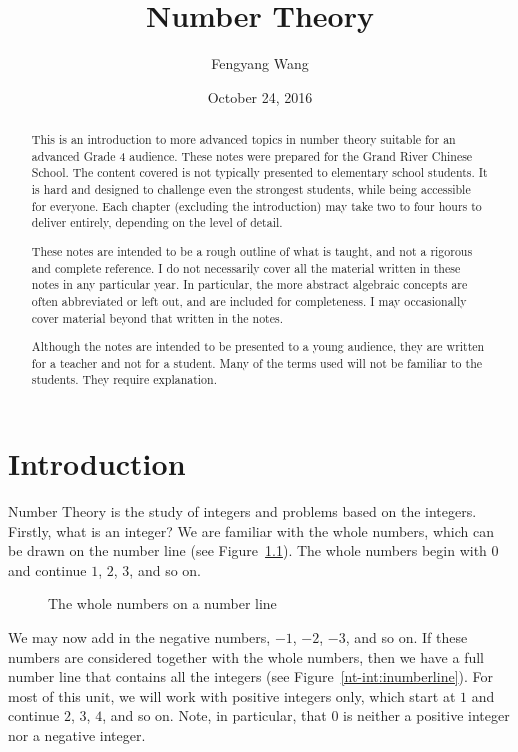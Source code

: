 \documentclass[a4paper,10pt]{report}
\title{Number Theory}
\author{Fengyang Wang}
\date{October 24, 2016}
\begin{document}
\begin{abstract}

This is an introduction to more advanced topics in number theory suitable for
an advanced Grade 4 audience. These notes were prepared for the Grand River
Chinese School. The content covered is not typically presented to elementary
school students. It is hard and designed to challenge even the strongest
students, while being accessible for everyone. Each chapter (excluding the
introduction) may take two to four hours to deliver entirely, depending on the
level of detail.

These notes are intended to be a rough outline of what is taught, and not a
rigorous and complete reference. I do not necessarily cover all the material
written in these notes in any particular year. In particular, the more abstract
algebraic concepts are often abbreviated or left out, and are included for
completeness. I may occasionally cover material beyond that written in the
notes.

Although the notes are intended to be presented to a young audience, they are
written for a teacher and not for a student. Many of the terms used will not be
familiar to the students. They require explanation.

\end{abstract}

\maketitle

\tableofcontents

\chapter{Introduction}

Number Theory is the study of \glspl{integer} and problems based on the
integers. Firstly, what is an integer? We are familiar with the whole numbers,
which can be drawn on the number line (see Figure~\ref{nt-int:pnumberline}).
The whole numbers begin with \(0\) and continue \(1\), \(2\), \(3\), and so on.

\begin{figure}

 \caption{The whole numbers on a number line}
 \label{nt-int:pnumberline}
\end{figure}

We may now add in the negative numbers, \(-1\), \(-2\), \(-3\), and so on. If
these numbers are considered together with the whole numbers, then we have a
full number line that contains all the integers (see
Figure~\ref{nt-int:inumberline}). For most of this unit, we will work with
positive integers only, which start at \(1\) and continue \(2\), \(3\), \(4\),
and so on. Note, in particular, that \(0\) is neither a positive integer nor a
negative integer.
\end{document}
